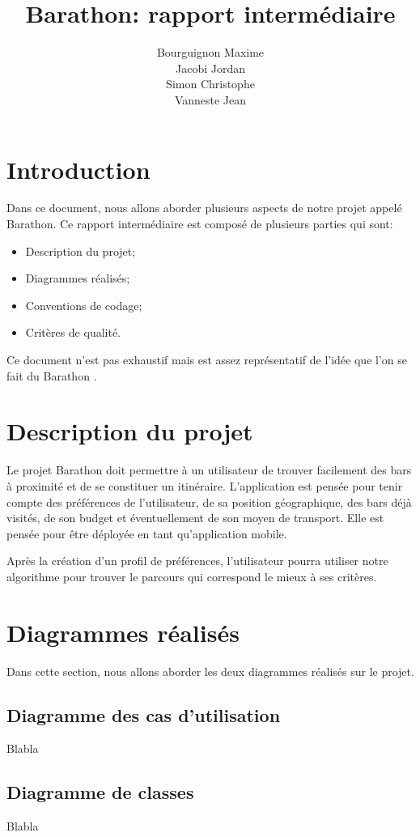 \documentclass[a4paper,11pt]{article}
\title{Barathon: rapport intermédiaire}
\author{Bourguignon Maxime \\ Jacobi Jordan \\ Simon Christophe \\ Vanneste Jean}
\begin{document}
\maketitle


\section*{Introduction}
Dans ce document, nous allons aborder plusieurs aspects de notre projet appelé \og{} Barathon\fg{}. Ce rapport intermédiaire est composé de plusieurs parties qui sont:
\begin{itemize}
 \item Description du projet;
 \item Diagrammes réalisés;
 \item Conventions de codage;
 \item Critères de qualité.
\end{itemize}
Ce document n'est pas exhaustif mais est assez représentatif de l'idée que l'on se fait du \og{} Barathon \fg{}.

\section{Description du projet}
Le projet Barathon doit permettre à un utilisateur de trouver facilement des bars à proximité et de se constituer un itinéraire. L'application est pensée pour tenir compte des préférences de l'utilisateur, de sa position géographique, des bars déjà visités, de son budget et éventuellement de son moyen de transport. Elle est pensée pour être déployée en tant qu'application mobile.

Après la création d'un profil de préférences, l'utilisateur pourra utiliser notre algorithme pour trouver le parcours qui correspond le mieux à ses critères.

\section{Diagrammes réalisés}
Dans cette section, nous allons aborder les deux diagrammes réalisés sur le projet.

\subsection{Diagramme des cas d'utilisation}
Blabla

\subsection{Diagramme de classes}
Blabla
\end{document}
